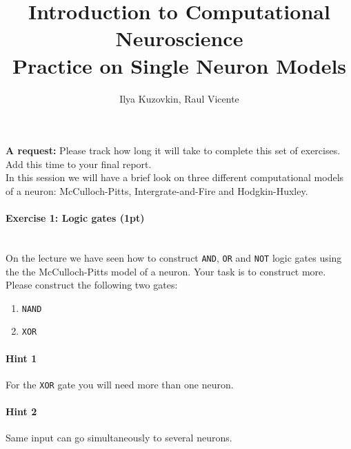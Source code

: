 \documentclass[a4paper,11pt]{article}
\author{\large{Ilya Kuzovkin, Raul Vicente}}
\title{\huge{Introduction to Computational Neuroscience}\\\LARGE{Practice on Single Neuron Models}}
\newenvironment{exercise}[3]{\paragraph{Exercise #1: #2 (#3pt)}\ \\}{
\medskip}
\begin{document}
\maketitle

\textbf{A request:} Please track how long it will take to complete this set of exercises. Add this time to your final report.
\ \\

%
%
In this session we will have a brief look on three different computational models of a neuron: McCulloch-Pitts, Intergrate-and-Fire and Hodgkin-Huxley.

%
%
\begin{exercise}{1}{Logic gates}{1}
On the lecture we have seen how to construct \texttt{AND}, \texttt{OR} and \texttt{NOT} logic gates using the the McCulloch-Pitts model of a neuron. Your task is to construct more. Please construct the following two gates:
\begin{enumerate}
\itemsep 0em
	\item \texttt{NAND}
	\item \texttt{XOR}
\end{enumerate}
\paragraph{Hint 1}For the \texttt{XOR} gate you will need more than one neuron.
\paragraph{Hint 2}Same input can go simultaneously to several neurons.
\end{exercise}
\end{document}
